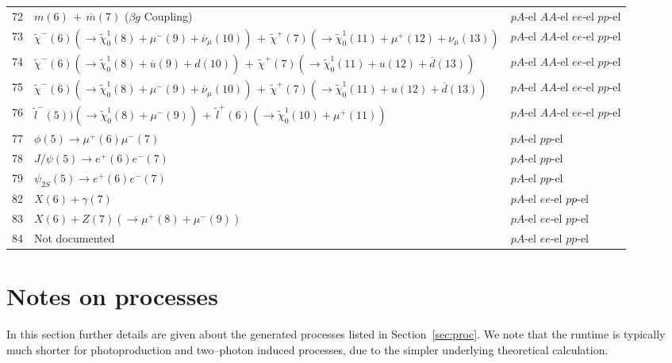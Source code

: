 \documentclass[12pt]{article}
\begin{document}
\begin{center}
\begin{table}[htbp!]
\begin{tabular}{|c|l|l|}
72 & $m(6)\,+\,\overline{m}(7)$ ($\beta g$ Coupling) &  $pA$-el  $AA$-el  $ee$-el  $pp$-el  \\

73 & $\tilde{\chi}^-(6)(\to \tilde{\chi}_0^1 (8)+\mu^-(9)+\overline{\nu}_\mu (10)) \,+\,\tilde{\chi}^+(7)(\to \tilde{\chi}_0^1 (11)+\mu^+(12)+\nu_\mu (13))$ &  $pA$-el  $AA$-el  $ee$-el  $pp$-el  \\

74 & $\tilde{\chi}^-(6)(\to \tilde{\chi}_0^1 (8)+\overline{u}(9)+d(10)) \,+\,\tilde{\chi}^+(7)(\to \tilde{\chi}_0^1 (11)+u(12)+\overline{d} (13))$ &  $pA$-el  $AA$-el  $ee$-el  $pp$-el  \\

75 & $\tilde{\chi}^-(6)(\to \tilde{\chi}_0^1 (8)+\mu^-(9)+\overline{\nu}_\mu (10)) \,+\,\tilde{\chi}^+(7)(\to \tilde{\chi}_0^1 (11)+u(12)+\overline{d} (13))$ &  $pA$-el  $AA$-el  $ee$-el  $pp$-el  \\

76 & $\tilde{l}^-(5))(\to \tilde{\chi}_0^1 (8)+\mu^-(9)) \,+\,\tilde{l}^+(6) (\to \tilde{\chi}_0^1 (10)+\mu^+(11))$ &  $pA$-el  $AA$-el  $ee$-el  $pp$-el  \\

77 & $\phi(5)\to \mu^+(6)\mu^-(7)$ &  $pA$-el  $pp$-el  \\

78 & $J/\psi(5)\to e^+(6)e^-(7)$ &  $pA$-el  $pp$-el  \\

79 & $\psi_{2S}(5)\to e^+(6)e^-(7)$ &  $pA$-el  $pp$-el  \\

82 & $X(6) + \gamma(7)$ &  $pA$-el  $ee$-el  $pp$-el  \\

83 & $X(6) + Z(7)(\to \mu^+ (8)+\mu^- (9))$ &  $pA$-el  $ee$-el  $pp$-el  \\

84 & Not documented &  $pA$-el  $ee$-el  $pp$-el  \\

\hline
\end{tabular}
\end{table}
\end{center}


\section{Notes on processes}\label{sec:procnot}

In this section further details are given about the generated processes listed in Section~\ref{sec:proc}. We note that the runtime is typically 
much shorter for photoproduction and two--photon induced processes, due to the simpler underlying theoretical calculation.
\end{document}
